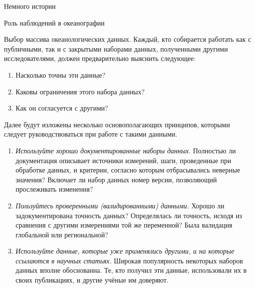 \begin{chapter}{Немного истории}
\begin{section}{Роль наблюдений в океанографии}
\begin{paragraph}{Выбор массива океанологических данных.}
Каждый, кто собирается работать как с публичными, так и с закрытыми 
наборами данных, полученными другими исследователями, должен предварительно
выяснить следующее:
\begin{enumerate}
   \item Насколько точны эти данные?
   \item Каковы ограничения этого набора данных?
   \item Как он согласуется с другими?
\end{enumerate}
%

Далее будут изложены несколько основополагающих принципов, которыми следует
руководствоваться при работе с такими данными.
%

\begin{enumerate}
\item
\emph{Используйте хорошо документированные наборы данных.} Полностью ли
документация описывает источники измерений, шаги, проведенные при
обработке данных, и критерии, согласно которым отбрасывались неверные
значения? Включает ли набор данных номер версии, позволяющий 
прослеживать изменения?
%

\item
\emph{Пользуйтесь проверенными (валидированными) данными.} Хорошо ли
задокументирована точность данных? Определялась ли точность, исходя из
сравнения с другими измерениями той же переменной? Была валидация
глобальной или региональной?
%

\item
\emph{Используйте данные, которые уже применялись другими, и на которые
ссылаются в научных статьях.} Широкая популярность некоторых наборов данных 
вполне обоснованна. Те, кто получил эти данные, использовали их в 
своих публикациях, и другие учёные им доверяют.
%


\end{enumerate}
\end{paragraph}
\end{section}
\end{chapter}
